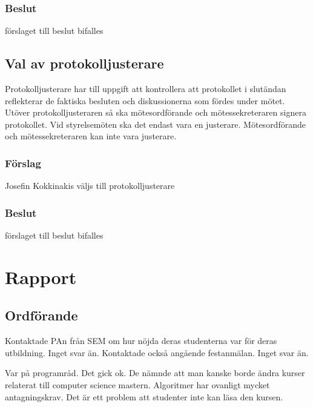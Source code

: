 \documentclass[protokoll]{dvd}
\begin{document}
\subsubsection*{Beslut}
\begin{attsatser}
    \item förslaget till beslut bifalles
\end{attsatser}

\subsection{Val av protokolljusterare}

Protokolljusterare har till uppgift att kontrollera att protokollet i slutändan reflekterar de faktiska besluten och diskussionerna som fördes under mötet.
Utöver protokolljusteraren så ska mötesordförande och mötessekreteraren signera protokollet.
Vid styrelsemöten ska det endast vara en justerare.
Mötesordförande och mötessekreteraren kan inte vara justerare.

\subsubsection*{Förslag}
\begin{attsatser}
    \item Josefin Kokkinakis väljs till protokolljusterare
\end{attsatser}
\subsubsection*{Beslut}
\begin{attsatser}
    \item förslaget till beslut bifalles
\end{attsatser}

\section{Rapport}
\subsection{Ordförande}
Kontaktade PAn från SEM om hur nöjda deras studenterna var för deras utbildning. Inget svar än.
Kontaktade också angående festanmälan. Inget svar än.

Var på programråd. Det gick ok. De nämnde att man kanske borde ändra kurser relaterat till computer science mastern. Algoritmer har ovanligt mycket antagningskrav. Det är ett problem att studenter inte kan läsa den kursen.
\end{document}
